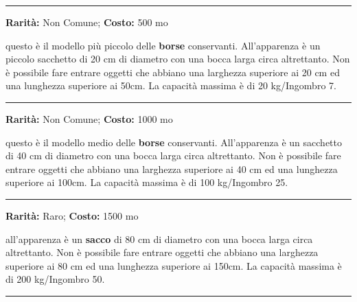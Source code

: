 \begin{multicols}{2}
\smallskip\noindent\rule{\linewidth}{2pt}  \hypertarget{BorsaConservanteTipoI}{}\smallskip{}\noindent\label{BorsaConservanteTipoI}

\textbf{Rarità:} Non Comune; \textbf{Costo:} 500 mo

questo è il modello più piccolo delle \textbf{borse} conservanti. All'apparenza è un piccolo sacchetto di 20 cm di diametro con una bocca larga circa altrettanto.
Non è possibile fare entrare oggetti che abbiano una larghezza superiore ai 20 cm ed una lunghezza superiore ai 50cm.
La capacità massima è di 20 kg/Ingombro 7.

\smallskip\noindent\rule{\linewidth}{2pt}  \hypertarget{BorsaConservanteTipoII}{}\smallskip{}\noindent\label{BorsaConservanteTipoII}

\textbf{Rarità:} Non Comune; \textbf{Costo:} 1000 mo

questo è il modello medio delle \textbf{borse} conservanti. All'apparenza è un sacchetto di 40 cm di diametro con una bocca larga circa altrettanto.
Non è possibile fare entrare oggetti che abbiano una larghezza superiore ai 40 cm ed una lunghezza superiore ai 100cm.
La capacità massima è di 100 kg/Ingombro 25.

\smallskip\noindent\rule{\linewidth}{2pt}  \hypertarget{BorsaConservanteTipoIII}{}\smallskip{}\noindent\label{BorsaConservanteTipoIII}

\textbf{Rarità:} Raro; \textbf{Costo:} 1500 mo

all'apparenza è un \textbf{sacco} di 80 cm di diametro con una bocca larga circa altrettanto.
Non è possibile fare entrare oggetti che abbiano una larghezza superiore ai 80 cm ed una lunghezza superiore ai 150cm. La capacità massima è di 200 kg/Ingombro 50.

\smallskip\noindent\rule{\linewidth}{2pt}  \hypertarget{BorsaConservanteTipoIV}{}\smallskip{}\noindent\label{BorsaConservanteTipoIV}


\end{multicols}
